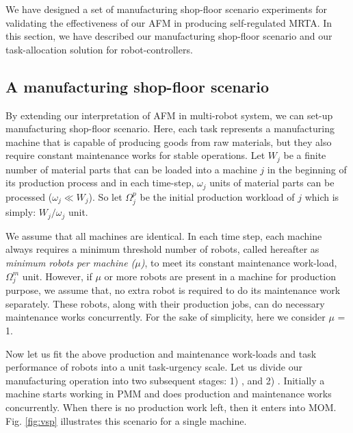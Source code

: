 \documentclass[journal]{IEEEtran}
\begin{document}
We have designed a set of  manufacturing shop-floor scenario experiments for validating the effectiveness of our AFM in producing self-regulated MRTA.  In this section, we have described our manufacturing shop-floor scenario and our task-allocation solution for robot-controllers.
\subsection{A manufacturing shop-floor scenario}
\label{afm:vms}
By extending our interpretation of AFM in multi-robot system, we can set-up manufacturing shop-floor  scenario. Here, each task represents a manufacturing machine that is  capable of producing goods from raw materials, but they also require constant maintenance works for stable operations. Let $W_{j}$ be a finite number of material parts that can be loaded into a machine $j$ in the beginning of its production process and in each time-step, $\omega_{j}$ units of material parts can be processed  ($\omega_{j} \ll W_{j} $). So let $\Omega_{j}^{p}$ be the initial production workload of $j$ which is simply: $W_{j} / \omega_{j}$ unit.

We assume that all machines are identical. In each time step, each machine always requires a minimum threshold number of robots, called hereafter as {\em minimum robots per machine ($\mu$)}, to meet its constant maintenance work-load, $\Omega_{j}^{m}$ unit. However, if $\mu$ or more robots are present in a machine for production purpose, we assume that, no extra robot is required to do its maintenance work separately. These robots, along with their production jobs, can do necessary maintenance works concurrently. For the sake of simplicity, here we consider $\mu$ = 1.

Now let us fit the above production and maintenance work-loads and task performance of robots into a unit task-urgency scale. Let us divide our manufacturing operation into two subsequent stages: 1) , and 2) . Initially a machine starts working in PMM and does production and maintenance works concurrently. When there is no production work left, then it  enters into MOM. Fig. \ref{fig:vsp} illustrates this scenario for a single machine.
\end{document}
